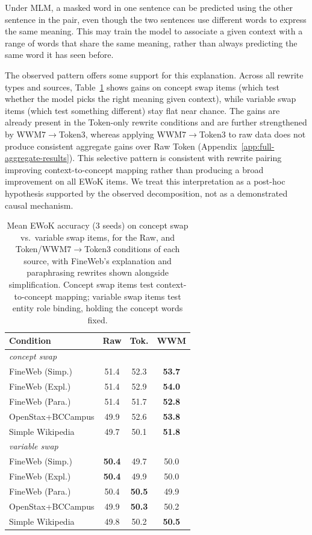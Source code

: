 \documentclass[11pt]{article}
\begin{document}
Under MLM, a masked word in one sentence can be predicted using the other sentence in the pair, even though the two sentences use different words to express the same meaning. This may train the model to associate a given context with a range of words that share the same meaning, rather than always predicting the same word it has seen before.

The observed pattern offers some support for this explanation. Across all rewrite types and sources, Table~\ref{tab:targetdiff} shows gains on concept swap items (which test whether the model picks the right meaning given context), while variable swap items (which test something different) stay flat near chance. The gains are already present in the Token-only rewrite conditions and are further strengthened by WWM7$\to$Token3, whereas applying WWM7$\to$Token3 to raw data does not produce consistent aggregate gains over Raw Token (Appendix~\ref{app:full-aggregate-results}). This selective pattern is consistent with rewrite pairing improving context-to-concept mapping rather than producing a broad improvement on all EWoK items. We treat this interpretation as a post-hoc hypothesis supported by the observed decomposition, not as a demonstrated causal mechanism.

\begin{table}[t]
\centering
\footnotesize
\setlength{\tabcolsep}{2pt}
\begin{tabular}{lccc}
\toprule
\textbf{Condition} & \textbf{Raw} & \textbf{Tok.} & \textbf{WWM} \\
\midrule
\multicolumn{4}{l}{\emph{concept swap}} \\
FineWeb (Simp.)    & 51.4 & 52.3 & \textbf{53.7} \\
FineWeb (Expl.)    & 51.4 & 52.9 & \textbf{54.0} \\
FineWeb (Para.)    & 51.4 & 51.7 & \textbf{52.8} \\
OpenStax+BCCampus  & 49.9 & 52.6 & \textbf{53.8} \\
Simple Wikipedia   & 49.7 & 50.1 & \textbf{51.8} \\
\midrule
\multicolumn{4}{l}{\emph{variable swap}} \\
FineWeb (Simp.)    & \textbf{50.4} & 49.7 & 50.0 \\
FineWeb (Expl.)    & \textbf{50.4} & 49.9 & 50.0 \\
FineWeb (Para.)    & 50.4 & \textbf{50.5} & 49.9 \\
OpenStax+BCCampus  & 49.9 & \textbf{50.3} & 50.2 \\
Simple Wikipedia   & 49.8 & 50.2 & \textbf{50.5} \\
\bottomrule
\end{tabular}
\caption{Mean EWoK accuracy (3 seeds) on concept swap vs.\ variable swap items, for the Raw, and Token/WWM7$\to$Token3 conditions of each source, with FineWeb's explanation and paraphrasing rewrites shown alongside simplification. Concept swap items test context-to-concept mapping; variable swap items test entity role binding, holding the concept words fixed.}
\label{tab:targetdiff}
\end{table}
\end{document}
